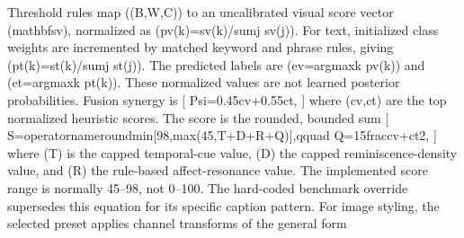\documentclass[conference]{IEEEtran}
\begin{document}
{}Threshold rules map ((B,W,C)) to an uncalibrated visual score vector (\markdownRendererBackslash{}mathbf\markdownRendererLeftBrace{}s\markdownRendererRightBrace{}\markdownRendererUnderscore{}v), normalized as (p\markdownRendererUnderscore{}v(k)=s\markdownRendererUnderscore{}v(k)/\markdownRendererBackslash{}sum\markdownRendererUnderscore{}j s\markdownRendererUnderscore{}v(j)). For text, initialized class weights are incremented by matched keyword and phrase rules, giving (p\markdownRendererUnderscore{}t(k)=s\markdownRendererUnderscore{}t(k)/\markdownRendererBackslash{}sum\markdownRendererUnderscore{}j s\markdownRendererUnderscore{}t(j)). The predicted labels are (e\markdownRendererUnderscore{}v=\markdownRendererBackslash{}arg\markdownRendererBackslash{}max\markdownRendererUnderscore{}k p\markdownRendererUnderscore{}v(k)) and (e\markdownRendererUnderscore{}t=\markdownRendererBackslash{}arg\markdownRendererBackslash{}max\markdownRendererUnderscore{}k p\markdownRendererUnderscore{}t(k)). These normalized values are not learned posterior probabilities.\markdownRendererParagraphSeparator
{}Fusion synergy is\markdownRendererParagraphSeparator
{}[\markdownRendererSoftLineBreak
{}\markdownRendererBackslash{}Psi=0.45c\markdownRendererUnderscore{}v+0.55c\markdownRendererUnderscore{}t,\markdownRendererSoftLineBreak
{}]\markdownRendererParagraphSeparator
{}where (c\markdownRendererUnderscore{}v,c\markdownRendererUnderscore{}t) are the top normalized heuristic scores. The score is the rounded, bounded sum\markdownRendererParagraphSeparator
{}[\markdownRendererSoftLineBreak
{}S=\markdownRendererBackslash{}operatorname\markdownRendererLeftBrace{}round\markdownRendererRightBrace{}\markdownRendererLeftBrace{}\markdownRendererBackslash{}min[98,\markdownRendererBackslash{}max(45,T+D+R+Q)]\markdownRendererRightBrace{},\markdownRendererBackslash{}qquad\markdownRendererSoftLineBreak
{}Q=15\markdownRendererBackslash{}frac\markdownRendererLeftBrace{}c\markdownRendererUnderscore{}v+c\markdownRendererUnderscore{}t\markdownRendererRightBrace{}\markdownRendererLeftBrace{}2\markdownRendererRightBrace{},\markdownRendererSoftLineBreak
{}]\markdownRendererParagraphSeparator
{}where (T) is the capped temporal-cue value, (D) the capped reminiscence-density value, and (R) the rule-based affect-resonance value. The implemented score range is normally 45–98, not 0–100. The hard-coded benchmark override supersedes this equation for its specific caption pattern.\markdownRendererParagraphSeparator
{}For image styling, the selected preset applies channel transforms of the general form\markdownRendererParagraphSeparator
\end{document}
